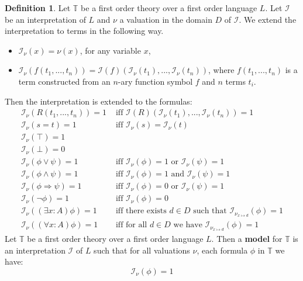\documentclass[12pt]{article}
\theoremstyle{plain}
\theoremstyle{definition}
\newtheorem{defn}[thm]{Definition} %
\newcommand{\bb}[1]{\mathbb{#1}}
\newcommand{\call}[1]{\mathcal{#1}}
\begin{document}
	\begin{defn}\label{def:interpretation}
		Let $\bb{T}$ be a first order theory over a first order language $L$. Let $\call{I}$ be an interpretation of $L$ and $\nu$ a valuation in the domain $D$ of $\call{I}$. We extend the interpretation to terms in the following way.
		\begin{itemize}
			\item $\call{I}_{\nu}(x) = \nu(x)$, for any variable $x$,
			\item $\call{I}_{\nu}(f(t_1,...,t_n)) = \call{I}(f)(\call{I}_{\nu}(t_1),...,\call{I}_{\nu}(t_n))$, where $f(t_1,...,t_n)$ is a term constructed from an $n$-ary function symbol $f$ and $n$ terms $t_i$.
		\end{itemize}
		Then the interpretation is extended to the formulas:
		\begin{align}
			\call{I}_{\nu}(R(t_1,...,t_n)) = 1 &\text{ iff } \call{I}(R)(\call{I}_{\nu}(t_1),...,\call{I}_{\nu}(t_n)) = 1\\
			\call{I}_{\nu}(s = t) = 1 &\text{ iff }\call{I}_{\nu}(s) = \call{I}_{\nu}(t)\\
			\call{I}_{\nu}(\top) = 1&\\
			\call{I}_{\nu}(\bot) = 0&\\
			\call{I}_{\nu}(\phi \vee \psi) = 1&\text{ iff }\call{I}_{\nu}(\phi) = 1\text{ or }\call{I}_{\nu}(\psi) = 1\\
			\call{I}_{\nu}(\phi \wedge \psi) = 1&\text{ iff }\call{I}_{\nu}(\phi) = 1\text{ and }\call{I}_{\nu}(\psi) = 1\\
			\call{I}_{\nu}(\phi \Rightarrow \psi) = 1&\text{ iff }\call{I}_{\nu}(\phi) = 0\text{ or }\call{I}_{\nu}(\psi) = 1\\
			\call{I}_{\nu}(\neg \phi) = 1&\text{ iff }\call{I}_{\nu}(\phi) = 0\\
			\call{I}_{\nu}((\exists x:A)\phi) = 1&\text{ iff there exists }d \in D\text{ such that }\call{I}_{\nu_{x \mapsto d}}(\phi) = 1\\
			\call{I}_{\nu}((\forall x:A)\phi) = 1&\text{ iff for all }d \in D\text{ we have }\call{I}_{\nu_{x \mapsto d}}(\phi) = 1
		\end{align}
		Let $\bb{T}$ be a first order theory over a first order language $L$. Then a \textbf{model} for $\bb{T}$ is an interpretation $\call{I}$ of $L$ such that for all valuations $\nu$, each formula $\phi$ in $\bb{T}$ we have:
		\begin{equation}
			\call{I}_{\nu}(\phi) = 1
		\end{equation}
	\end{defn}
\end{document}
